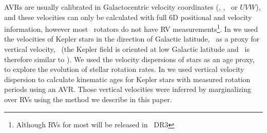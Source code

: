 AVRs are usually calibrated in Galactocentric velocity coordinates (\vx, \vy,
\vz\ or $UVW$), and these velocities can only be calculated with full 6D
positional and velocity information, however most \kepler\ rotators do not
have RV measurements\footnote{Although RVs for most will be released in \gaia\
DR3}.
In \citet{angus2020} we used the velocities of Kepler stars in the direction
of Galactic latitude, \vb\, as a proxy for vertical velocity, \vz\ (the Kepler
field is oriented at low Galactic latitude and \vb\ is therefore similar to
\vz).
We used the velocity dispersions of stars as an age proxy, to explore the
evolution of stellar rotation rates.
In \citet{lu2021} we used vertical velocity dispersion to calculate kinematic
ages for Kepler stars with measured rotation periods using an AVR.
Those vertical velocities were inferred by marginalizing over RVs using the
method we describe in this paper.

